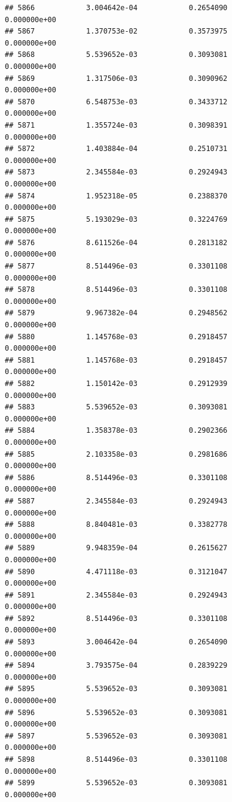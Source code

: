 \documentclass[
]{article}
\begin{document}
\begin{verbatim}
## 5866            3.004642e-04            0.2654090            0.000000e+00
## 5867            1.370753e-02            0.3573975            0.000000e+00
## 5868            5.539652e-03            0.3093081            0.000000e+00
## 5869            1.317506e-03            0.3090962            0.000000e+00
## 5870            6.548753e-03            0.3433712            0.000000e+00
## 5871            1.355724e-03            0.3098391            0.000000e+00
## 5872            1.403884e-04            0.2510731            0.000000e+00
## 5873            2.345584e-03            0.2924943            0.000000e+00
## 5874            1.952318e-05            0.2388370            0.000000e+00
## 5875            5.193029e-03            0.3224769            0.000000e+00
## 5876            8.611526e-04            0.2813182            0.000000e+00
## 5877            8.514496e-03            0.3301108            0.000000e+00
## 5878            8.514496e-03            0.3301108            0.000000e+00
## 5879            9.967382e-04            0.2948562            0.000000e+00
## 5880            1.145768e-03            0.2918457            0.000000e+00
## 5881            1.145768e-03            0.2918457            0.000000e+00
## 5882            1.150142e-03            0.2912939            0.000000e+00
## 5883            5.539652e-03            0.3093081            0.000000e+00
## 5884            1.358378e-03            0.2902366            0.000000e+00
## 5885            2.103358e-03            0.2981686            0.000000e+00
## 5886            8.514496e-03            0.3301108            0.000000e+00
## 5887            2.345584e-03            0.2924943            0.000000e+00
## 5888            8.840481e-03            0.3382778            0.000000e+00
## 5889            9.948359e-04            0.2615627            0.000000e+00
## 5890            4.471118e-03            0.3121047            0.000000e+00
## 5891            2.345584e-03            0.2924943            0.000000e+00
## 5892            8.514496e-03            0.3301108            0.000000e+00
## 5893            3.004642e-04            0.2654090            0.000000e+00
## 5894            3.793575e-04            0.2839229            0.000000e+00
## 5895            5.539652e-03            0.3093081            0.000000e+00
## 5896            5.539652e-03            0.3093081            0.000000e+00
## 5897            5.539652e-03            0.3093081            0.000000e+00
## 5898            8.514496e-03            0.3301108            0.000000e+00
## 5899            5.539652e-03            0.3093081            0.000000e+00

\end{verbatim}
\end{document}
